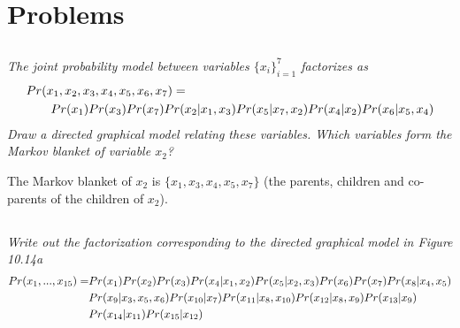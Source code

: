 \documentclass[11pt]{report}
\begin{document}
\chapter{Problems}
\section{}
\textit{The joint probability model between variables $\{x_i\}_{i=1}^7$ factorizes as}
\begin{equation} 
\begin{aligned}
&Pr(x_1, x_2, x_3, x_4, x_5, x_6, x_7) = \\
&\quad \quad Pr(x_1) Pr(x_3) Pr(x_7) Pr(x_2 | x_1, x_3) Pr(x_5 | x_7, x_2) Pr(x_4 | x_2) Pr (x_6 | x_5, x_4) \notag
\end{aligned}
\end{equation}
\textit{Draw a directed graphical model relating these variables. Which variables form the Markov blanket of variable $x_2$?}
\begin{figure}[h]
\end{figure}

The Markov blanket of $x_2$ is $\{x_1, x_3, x_4, x_5, x_7 \}$ (the parents, children and co-parents of the children of $x_2$).
\FloatBarrier

\section{}
\textit{Write out the factorization corresponding to the directed graphical model in Figure 10.14a }
\begin{equation} 
\begin{aligned}
Pr(x_1, ..., x_{15}) = &Pr(x_1) Pr(x_2) Pr(x_3) Pr(x_4 | x_1, x_2) Pr(x_5 | x_2, x_3) Pr(x_6) Pr(x_7) Pr(x_8 | x_4, x_5) \\
    & Pr(x_9 | x_3, x_5, x_6) Pr(x_{10} | x_7) Pr(x_{11} | x_8, x_{10}) Pr(x_{12} | x_8, x_9) Pr(x_{13} | x_9) \\
    & Pr(x_{14} | x_{11}) Pr(x_{15} | x_{12}) \notag
\end{aligned} 
\end{equation}
\end{document}
